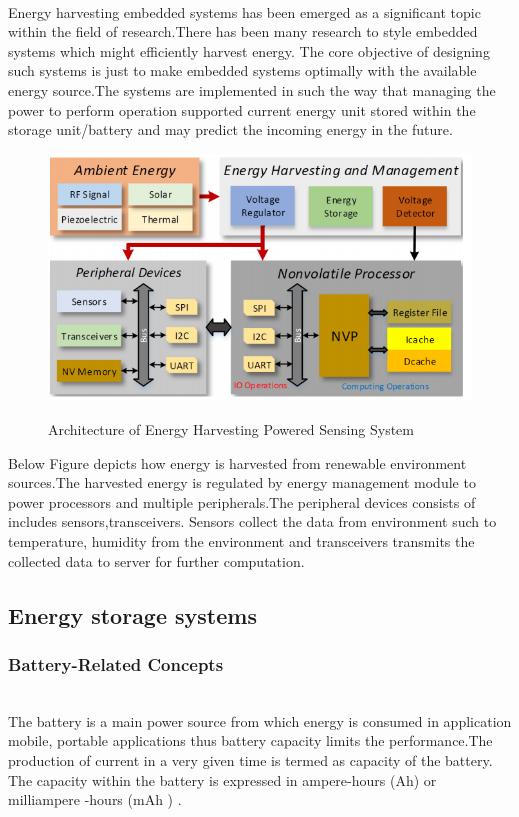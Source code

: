 \documentclass[12pt,hidelinks]{article}
\begin{document}
{\\Energy harvesting embedded systems has been emerged as a significant topic within the field of research.There has been many research to style embedded systems which might efficiently harvest energy. The core objective of designing such systems is just to make embedded systems optimally with the available energy source.The systems are implemented in such the way that managing the power to perform operation supported current energy unit stored within the storage unit/battery and may predict the incoming energy in the future.
\begin{figure}[htp]
    \centering
    \includegraphics[width=0.7\linewidth]{Energy harvesting and managment.png}
    \caption{Architecture of Energy Harvesting Powered Sensing System}\cite{second}
    \label{fig:Architecture of Energy Harvesting Powered Sensing System}
\end{figure}
Below Figure depicts how energy is harvested from renewable environment sources.The harvested energy is regulated by energy management module to power processors and multiple peripherals.The peripheral devices consists of includes sensors,transceivers. Sensors collect the data from environment such to temperature, humidity from the environment and transceivers transmits the collected data to server for further computation.

\subsection{Energy storage systems}

\subsubsection{Battery-Related Concepts}
\newline
\\ The battery is a main power source from which energy is consumed in application mobile, portable applications thus battery capacity limits the performance.The production of current in a very given time is termed as capacity of the battery. The capacity within the battery is expressed in ampere-hours (Ah) or milliampere -hours (mAh ) \cite{battery}.\newline

}
\end{document}
